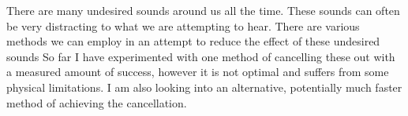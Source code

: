 \thispagestyle{plain}
There are many undesired sounds around us all the time.
These sounds can often be very distracting to what we are attempting to hear.
There are various methods we can employ in an attempt to reduce the effect of these undesired sounds
So far I have experimented with one method of cancelling these out with a measured amount of success, however it is not optimal and suffers from some physical limitations.
I am also looking into an alternative, potentially much faster method of achieving the cancellation.
